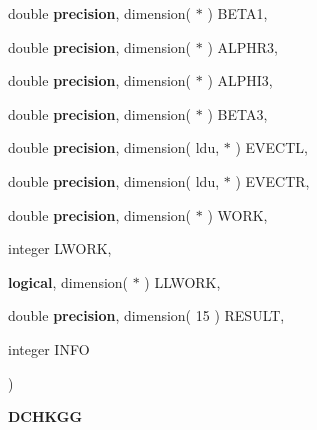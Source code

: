 {\begin{DoxyParamCaption}
\item[{double {\bf precision}, dimension( $\ast$ )}]{B\+E\+T\+A1, }
\item[{double {\bf precision}, dimension( $\ast$ )}]{A\+L\+P\+H\+R3, }
\item[{double {\bf precision}, dimension( $\ast$ )}]{A\+L\+P\+H\+I3, }
\item[{double {\bf precision}, dimension( $\ast$ )}]{B\+E\+T\+A3, }
\item[{double {\bf precision}, dimension( ldu, $\ast$ )}]{E\+V\+E\+C\+T\+L, }
\item[{double {\bf precision}, dimension( ldu, $\ast$ )}]{E\+V\+E\+C\+T\+R, }
\item[{double {\bf precision}, dimension( $\ast$ )}]{W\+O\+R\+K, }
\item[{integer}]{L\+W\+O\+R\+K, }
\item[{{\bf logical}, dimension( $\ast$ )}]{L\+L\+W\+O\+R\+K, }
\item[{double {\bf precision}, dimension( 15 )}]{R\+E\+S\+U\+L\+T, }
\item[{integer}]{I\+N\+F\+O}
\end{DoxyParamCaption}
)}\label{group__double__eig_ga90e3a487742ba9acb39f783362b5b300}


{\bfseries D\+C\+H\+K\+G\+G} 


